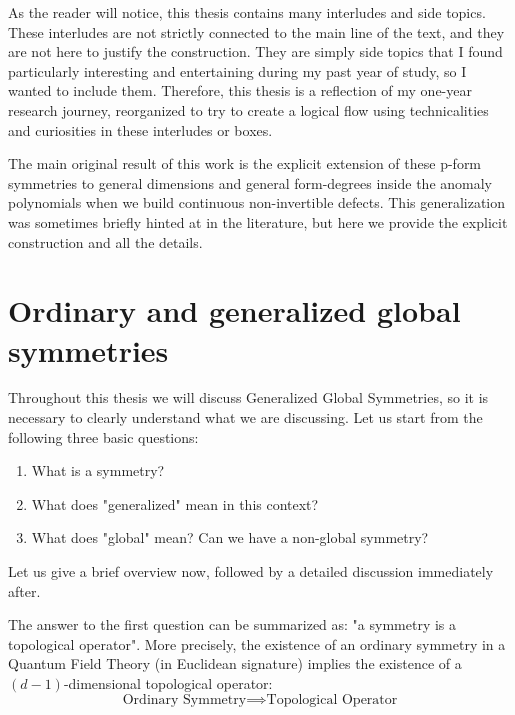 \documentclass[aps,preprint,nofootinbib,preprintnumbers,eqsecnum,superscriptaddress]{revtex4}
\numberwithin{equation}{section}
\begin{document}
As the reader will notice, this thesis contains many interludes and side topics. These interludes are not strictly connected to the main line of the text, and they are not here to justify the construction. They are simply side topics that I found particularly interesting and entertaining during my past year of study, so I wanted to include them. Therefore, this thesis is a reflection of my one-year research journey, reorganized to try to create a logical flow using technicalities and curiosities in these interludes or boxes.

The main original result of this work is the explicit extension of these p-form symmetries to general dimensions and general form-degrees inside the anomaly polynomials when we build continuous non-invertible defects. This generalization was sometimes briefly hinted at in the literature, but here we provide the explicit construction and all the details.



\newpage
\section{Ordinary and generalized global symmetries}

Throughout this thesis we will discuss Generalized Global Symmetries, so it is necessary to clearly understand what we are discussing. Let us start from the following three basic questions:
\begin{enumerate}[1.]
    \item What is a symmetry?
    \item What does "generalized" mean in this context?
    \item What does "global" mean? Can we have a non-global symmetry?
\end{enumerate}

Let us give a brief overview now, followed by a detailed discussion immediately after.

The answer to the first question can be summarized as: "a symmetry is a topological operator". More precisely, the existence of an ordinary symmetry in a Quantum Field Theory (in Euclidean signature) implies the existence of a $(d-1)$-dimensional topological operator:
\begin{equation}
    \text{Ordinary Symmetry} \implies \text{Topological Operator}
\end{equation}
\end{document}
